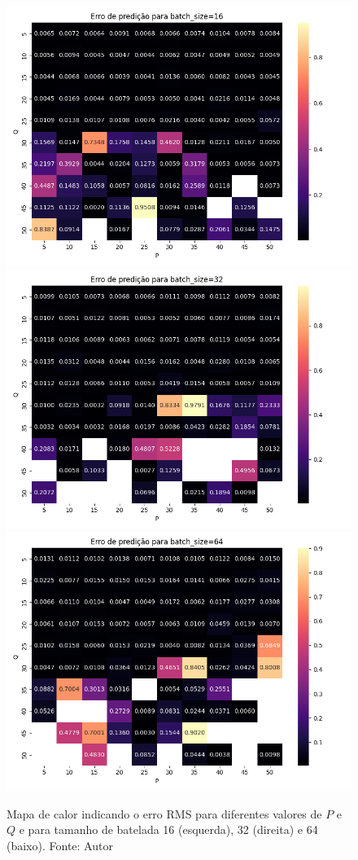 \begin{figure}[hbt!]
    \centering
    \includegraphics[width=0.7\linewidth]{Imagens/chap04/experiment_hp_metrics_16.png}
    \hfill
    \includegraphics[width=0.7\linewidth]{Imagens/chap04/experiment_hp_metrics_32.png}
    \hfill
    \includegraphics[width=0.7\linewidth]{Imagens/chap04/experiment_hp_metrics_64.png}
    \caption{Mapa de calor indicando o erro RMS para diferentes valores de $P$ e $Q$ e para tamanho de batelada 16 (esquerda), 32 (direita) e 64 (baixo). Fonte: Autor}
    \label{fig:exp_hp_metrics}
\end{figure}

